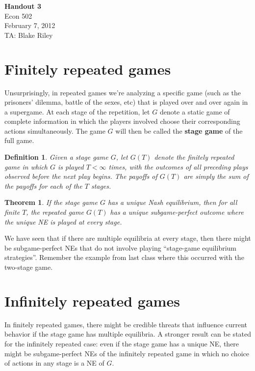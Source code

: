 \documentclass[letter, 10pt]{article}
\newtheorem{definition}{Definition}[section]
\newtheorem{theorem}{Theorem}[section]
\begin{document}
\begin{spacing}{1.1}

\noindent
\textbf{Handout 3} \\
Econ 502 \\
February 7, 2012 \\
TA: Blake Riley \\

\section{Finitely repeated games}

Unsurprisingly, in repeated games we're analyzing a
specific game (such as the prisoners' dilemma, battle of
the sexes, etc) that is played over and over again in a
supergame. At each stage of the repetition, let $G$
denote a static game of complete information in which the
players involved choose their corresponding actions
simultaneously. The game $G$ will then be called the
\textbf{stage game} of the full game.

\begin{definition}
  Given a stage game $G$, let $G(T)$ denote the finitely
  repeated game in which $G$ is played $T<\infty$ times,
  with the outcomes of all preceding plays observed
  before the next play begins. The payoffs of $G(T)$ are
  simply the sum of the payoffs for each of the $T$ stages.
\end{definition}

\begin{theorem}
  If the stage game $G$ has a unique Nash equilibrium,
  then for all finite $T$, the repeated game $G(T)$ has a
  unique subgame-perfect outcome where the unique NE is
  played at every stage.
\end{theorem}

We have seen that if there are multiple equilibria at every
stage, then there might be subgame-perfect NEs that do
not involve playing ``stage-game equilibrium
strategies''. Remember the example from last class where
this occurred with the two-stage game.

\section{Infinitely repeated games}

In finitely repeated games, there might be credible threats that influence
current behavior if the stage game has multiple equilibria. A stronger
result can be stated for the infinitely repeated case: even if the stage
game has a unique NE, there might be subgame-perfect NEs of the infinitely
repeated game in which no choice of actions in any stage is a NE of $G$.


\end{spacing}
\end{document}
